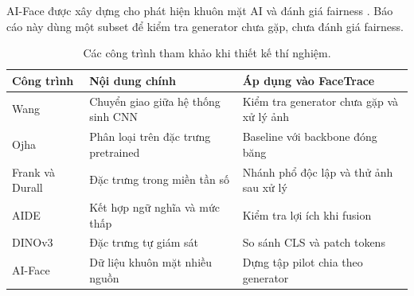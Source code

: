 AI-Face được xây dựng cho phát hiện khuôn mặt AI và đánh giá fairness \cite{Lin_2025_CVPR}. Báo cáo này dùng một subset để kiểm tra generator chưa gặp, chưa đánh giá fairness.

\begin{table}[H]
\centering
\caption{Các công trình tham khảo khi thiết kế thí nghiệm.}
\label{tab:related-work}
\small
\begin{tabularx}{\linewidth}{p{.22\linewidth}XX}
\toprule
Công trình & Nội dung chính & Áp dụng vào FaceTrace \\
\midrule
Wang \cite{Wang_2020_CVPR} & Chuyển giao giữa hệ thống sinh CNN & Kiểm tra generator chưa gặp và xử lý ảnh \\
Ojha \cite{Ojha_2023_CVPR} & Phân loại trên đặc trưng pretrained & Baseline với backbone đóng băng \\
Frank và Durall \cite{Frank_2020_ICML,Durall_2020_CVPR} & Đặc trưng trong miền tần số & Nhánh phổ độc lập và thử ảnh sau xử lý \\
AIDE \cite{AIDE_2025_ICLR} & Kết hợp ngữ nghĩa và mức thấp & Kiểm tra lợi ích khi fusion \\
DINOv3 \cite{DINOv3_2025} & Đặc trưng tự giám sát & So sánh CLS và patch tokens \\
AI-Face \cite{Lin_2025_CVPR} & Dữ liệu khuôn mặt nhiều nguồn & Dựng tập pilot chia theo generator \\
\bottomrule
\end{tabularx}
\end{table}
